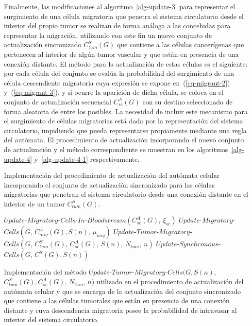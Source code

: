 Finalmente, las modificaciones al algoritmo~\ref{alg-update-3} para representar el surgimiento de una c\'elula migratoria que penetra el sistema circulatorio desde el interior del propio tumor se realizan de forma an\'aloga a las concebidas para representar la migraci\'on, utilizando con este fin un nuevo conjunto de actualizaci\'on sincronizado $C_{tum}^S(G)$ que contiene a las c\'elulas cancer\'igenas que pertenecen al interior de alg\'un tumor vascular y que est\'an en presencia de una conexi\'on distante. El m\'etodo para la actualizaci\'on de estas c\'elulas es el siguiente: por cada c\'elula del conjunto se eval\'ua la probabilidad del surgimiento de una c\'elula descendiente migratoria cuya expresi\'on se expone en~(\ref{eq-migrant-2}) y~(\ref{eq-migrant-3}), y si ocurre la aparici\'on de dicha c\'elula, se coloca en el conjunto de actualizaci\'on secuencial $C_{sc}^A(G)$ con su destino seleccionado de forma aleatoria de entre los posibles. La necesidad de incluir este mecanismo para el surgimiento de c\'elulas migratorias est\'a dada por la representaci\'on del sistema circulatorio, impidiendo que pueda representarse propiamente mediante una regla del aut\'omata. El procedimiento de actualizaci\'on incorporando el nuevo conjunto de actualizaci\'on y el m\'etodo correspondiente se muestran en los algoritmos~\ref{alg-update-4} y~\ref{alg-update-4-1} respectivamente. 

\begin{algorithm}[!ht]
\caption{Implementaci\'on del procedimiento de actualizaci\'on del aut\'omata celular incorporando el conjunto de actualizaci\'on sincronizado para las c\'elulas migratorias que penetran el sistema circulatorio desde una conexi\'on distante en el interior de un tumor $C_{tum}^S(G)$.} \label{alg-update-4}
$Update$-$Migratory$-$Cells$-$In$-$Bloodstream(C_{sc}^A(G),\,\xi_{sc})$\;
$Update$-$Migratory$-$Cells(G,\,C_{mig}^A(G),S(n),\,\mu_{mig})$\;
$Update$-$Tumor$-$Migratory$-$Cells(G,\,C_{tum}^S(G),\,C_{sc}^A(G),\,S(n),\,N_{tum},\,n)$\;
$Update$-$Synchronous$-$Cells(G,\,C^S(G),S(n))$\;
\end{algorithm}

\begin{algorithm}[!ht]
\caption{Implementaci\'on del m\'etodo $Update$-$Tumor$-$Migratory$-$Cells(G,S(n),$  $C_{tum}^S(G),C_{sc}^A(G),\,N_{tum},\,n)$ utilizado en el procedimiento de actualizaci\'on del aut\'omata celular y que se encarga de la actualizaci\'on del conjunto sincronizado que contiene a las c\'elulas tumorales que est\'an en presencia de una conexi\'on distante y cuya descendencia migratoria posee la probabilidad de intravasar al interior del sistema circulatorio.} \label{alg-update-4-1}
\end{algorithm}

